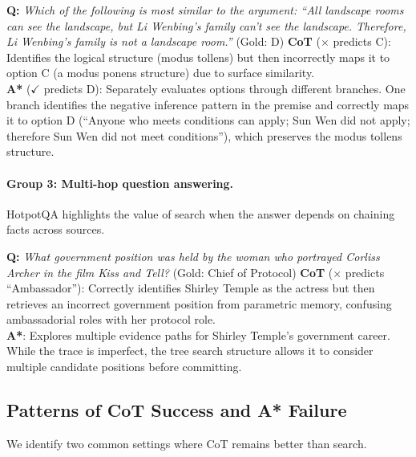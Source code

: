 \documentclass[11pt]{article}
\begin{document}
{\begin{examplebox}[title=LogicQA --- Hypothesis Elimination]
\textbf{Q:} \emph{Which of the following is most similar to the argument: ``All landscape rooms can see the landscape, but Li Wenbing's family can't see the landscape. Therefore, Li Wenbing's family is not a landscape room.''} \quad (Gold: D)
\tcblower
\textbf{CoT} ($\times$ predicts C): Identifies the logical structure (modus tollens) but then incorrectly maps it to option C (a modus ponens structure) due to surface similarity.\\[4pt]
\textbf{A*} ($\checkmark$ predicts D): Separately evaluates options through different branches. One branch identifies the negative inference pattern in the premise and correctly maps it to option D (``Anyone who meets conditions can apply; Sun Wen did not apply; therefore Sun Wen did not meet conditions''), which preserves the modus tollens structure.
\end{examplebox}

\paragraph{Group 3: Multi-hop question answering.}
HotpotQA highlights the value of search when the answer depends on chaining facts across sources.

\begin{examplebox}[title=HotpotQA --- Multi-hop Chaining]
\textbf{Q:} \emph{What government position was held by the woman who portrayed Corliss Archer in the film \textit{Kiss and Tell}?} \quad (Gold: Chief of Protocol)
\tcblower
\textbf{CoT} ($\times$ predicts ``Ambassador''): Correctly identifies Shirley Temple as the actress but then retrieves an incorrect government position from parametric memory, confusing ambassadorial roles with her protocol role.\\[4pt]
\textbf{A*}: Explores multiple evidence paths for Shirley Temple's government career. While the trace is imperfect, the tree search structure allows it to consider multiple candidate positions before committing.
\end{examplebox}

\subsection{Patterns of CoT Success and A* Failure}
\label{app:cot_success}

We identify two common settings where CoT remains better than search.

}
\end{document}
